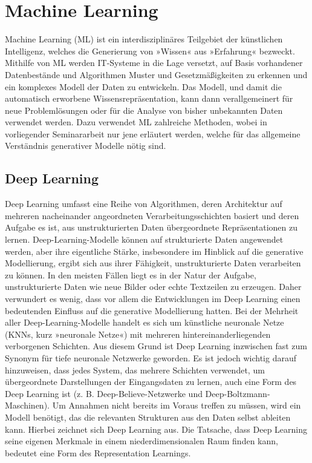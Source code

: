 \section{Machine Learning}\label{Machine Learning}
Machine Learning (ML) ist ein interdisziplinäres Teilgebiet der künstlichen Intelligenz, welches die Generierung von »Wissen« aus »Erfahrung« bezweckt. Mithilfe von ML werden IT-Systeme in die Lage versetzt, auf Basis vorhandener Datenbestände und Algorithmen Muster und Gesetzmäßigkeiten zu erkennen und ein komplexes Modell der Daten zu entwickeln. Das Modell, und damit die automatisch erworbene Wissensrepräsentation, kann dann verallgemeinert für neue Problemlösungen oder für die Analyse von bisher unbekannten Daten verwendet werden. Dazu verwendet ML zahlreiche Methoden, wobei in vorliegender Seminararbeit nur jene erläutert werden, welche für das allgemeine Verständnis generativer Modelle nötig sind.


\subsection{Deep Learning}\label{Deep Learning}
Deep Learning umfasst eine Reihe von Algorithmen, deren Architektur auf mehreren nacheinander angeordneten Verarbeitungsschichten basiert und deren Aufgabe es ist, aus unstrukturierten Daten übergeordnete Repräsentationen zu lernen.
Deep-Learning-Modelle können auf strukturierte Daten angewendet werden, aber ihre eigentliche Stärke, insbesondere im Hinblick auf die generative Modellierung, ergibt sich aus ihrer Fähigkeit, unstrukturierte Daten verarbeiten zu können. In den meisten Fällen liegt es in der Natur der Aufgabe, unstrukturierte Daten wie neue Bilder oder echte Textzeilen zu erzeugen. Daher verwundert es wenig, dass vor allem die Entwicklungen im Deep Learning einen bedeutenden Einfluss auf die generative Modellierung hatten.
Bei der Mehrheit aller Deep-Learning-Modelle handelt es sich um künstliche neuronale Netze (KNNs, kurz »neuronale Netze«) mit mehreren hintereinanderliegenden verborgenen Schichten. Aus diesem Grund ist Deep Learning inzwischen fast zum Synonym für tiefe neuronale Netzwerke geworden. Es ist jedoch wichtig darauf hinzuweisen, dass jedes System, das mehrere Schichten verwendet, um übergeordnete Darstellungen der Eingangsdaten zu lernen, auch eine Form des Deep Learning ist (z. B. Deep-Believe-Netzwerke und Deep-Boltzmann-Maschinen).
Um Annahmen nicht bereits im Voraus treffen zu müssen, wird ein Modell benötigt, das die relevanten Strukturen aus den Daten selbst ableiten kann. Hierbei zeichnet sich Deep Learning aus. Die Tatsache, dass Deep Learning seine eigenen Merkmale in einem niederdimensionalen Raum finden kann, bedeutet eine Form des Representation Learnings.

